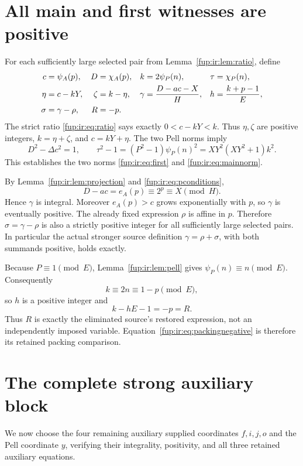 \documentclass[11pt,letterpaper]{article}
\theoremstyle{definition}\newtheorem{definition}[theorem]{Definition}
\theoremstyle{remark}\newtheorem{remark}[theorem]{Remark}
\begin{document}
\section{All main and first witnesses are positive}\label{fup:ir:sec:mainwitnesses}
For each sufficiently large selected pair from Lemma~\ref{fup:ir:lem:ratio}, define
\begin{align}
 c&=\psi_A(p),&D&=\chi_A(p),& k&=2\psi_P(n),&\tau&=\chi_P(n),\label{fup:ir:eq:mainchoices}\\
 \eta&=c-kY,&\zeta&=k-\eta,&
 \gamma&=\frac{D-ac-X}{H},&h&=\frac{k+p-1}{E},\label{fup:ir:eq:slacks}\\
 \sigma&=\gamma-\rho,&R&=-p.&&&&\notag
\end{align}
The strict ratio \eqref{fup:ir:eq:ratio} says exactly $0<c-kY<k$. Thus $\eta,\zeta$ are positive integers, $k=\eta+\zeta$, and $c=kY+\eta$. The two Pell norms imply
\[
 D^2-\Delta c^2=1,\qquad
 \tau^2-1=(P^2-1)\psi_P(n)^2=XY^2(XY^2+1)k^2.
\]
This establishes the two norms \eqref{fup:ir:eq:first} and \eqref{fup:ir:eq:mainnorm}.

By Lemma~\ref{fup:ir:lem:projection} and \eqref{fup:ir:eq:pconditions},
\[
 D-ac=e_A(p)\equiv2^p\equiv X\pmod H.
\]
Hence $\gamma$ is integral. Moreover $e_A(p)>c$ grows exponentially with $p$, so $\gamma$ is eventually positive. The already fixed expression $\rho$ is affine in $p$. Therefore $\sigma=\gamma-\rho$ is also a strictly positive integer for all sufficiently large selected pairs. In particular the actual stronger source definition $\gamma=\rho+\sigma$, with both summands positive, holds exactly.

Because $P\equiv1\pmod E$, Lemma~\ref{fup:ir:lem:pell} gives $\psi_P(n)\equiv n\pmod E$. Consequently
\[
 k\equiv2n\equiv1-p\pmod E,
\]
so $h$ is a positive integer and
\begin{equation}\label{fup:ir:eq:restored}
 k-hE-1=-p=R.
\end{equation}
Thus $R$ is exactly the eliminated source's restored expression, not an independently imposed variable. Equation~\eqref{fup:ir:eq:packingnegative} is therefore its retained packing comparison.

\section{The complete strong auxiliary block}\label{fup:ir:sec:aux}
We now choose the four remaining auxiliary supplied coordinates $f,i,j,o$ and the Pell coordinate $y$, verifying their integrality, positivity, and all three retained auxiliary equations.
\end{document}
